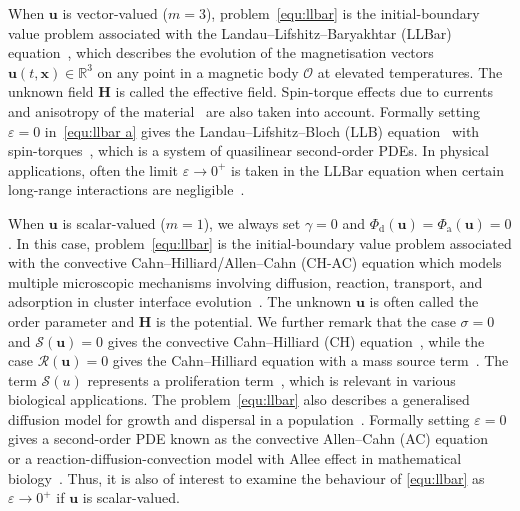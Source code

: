\documentclass[11pt, reqno]{amsart}
\theoremstyle{definition}
\numberwithin{equation}{section}
\newcommand{\bff}{\boldsymbol}
\newcommand{\bb}{\mathbb}
\begin{document}
When $\bff{u}$ is vector-valued ($m=3$), problem~\eqref{equ:llbar} is the initial-boundary value problem associated with the Landau--Lifshitz--Baryakhtar (LLBar) equation~\cite{BarBar98, Bar84, BarIva15, DvoVanVan14}, which describes the evolution of the magnetisation vectors $\bff{u}(t,\bff{x}) \in \bb{R}^3$ on any point in a magnetic body $\mathscr{O}$ at elevated temperatures. The unknown field $\bff{H}$ is called the effective field. Spin-torque effects due to currents~\cite{WanDvo15, YasFasIvaMak22} and anisotropy of the material~\cite{ManMukPan19} are also taken into account. Formally setting $\varepsilon=0$ in~\eqref{equ:llbar a} gives the Landau--Lifshitz--Bloch (LLB) equation~\cite{Gar91, Gar97, Le16} with spin-torques~\cite{AyoKotMouZak21}, which is a system of quasilinear second-order PDEs. In physical applications, often the limit $\varepsilon\to 0^+$ is taken in the LLBar equation when certain long-range interactions are negligible~\cite{DvoVanVan13, WanDvo15}.


When $\bff{u}$ is scalar-valued ($m=1$), we always set $\gamma=0$ and $\Phi_{\mathrm{d}}(\bff{u})= \Phi_{\mathrm{a}}(\bff{u})=0$. In this case, problem~\eqref{equ:llbar} is the initial-boundary value problem associated with the convective Cahn--Hilliard/Allen--Cahn (CH-AC) equation which models multiple microscopic mechanisms involving diffusion, reaction, transport, and adsorption in cluster interface evolution~\cite{AntKarTzi21, KarKat07, KarNag14, Kha21}. The unknown $\bff{u}$ is often called the order parameter and $\bff{H}$ is the potential.
We further remark that the case $\sigma=0$ and $\mathcal{S}(\bff{u})=0$ gives the convective Cahn--Hilliard (CH) equation~\cite{EdeKal07, GolDavNep98}, while the case $\mathcal{R}(\bff{u})=0$ gives the Cahn--Hilliard equation with a mass source term~\cite{FakMghNas21, Lam22, MchDav20, Mir21}. The term $\mathcal{S}(u)$ represents a proliferation term~\cite{SenKha24, FakMghNas21, Mir13}, which is relevant in various biological applications. The problem~\eqref{equ:llbar} also describes a generalised diffusion model for growth and dispersal in a population~\cite{CohMur81}. Formally setting $\varepsilon=0$ gives a second-order PDE known as the convective Allen--Cahn (AC) equation~\cite{SheTanYan16, SheZha22} or a reaction-diffusion-convection model with Allee effect in mathematical biology~\cite{WanShiWan19}. Thus, it is also of interest to examine the behaviour of \eqref{equ:llbar} as $\varepsilon\to 0^+$ if $\bff{u}$ is scalar-valued.
\end{document}
